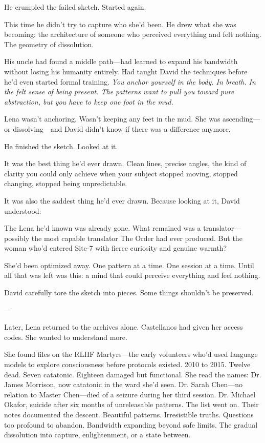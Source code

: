 He crumpled the failed sketch. Started again.

This time he didn't try to capture who she'd been. He drew what she was becoming: the architecture of someone who perceived everything and felt nothing. The geometry of dissolution.

His uncle had found a middle path—had learned to expand his bandwidth without losing his humanity entirely. Had taught David the techniques before he'd even started formal training. \textit{You anchor yourself in the body. In breath. In the felt sense of being present. The patterns want to pull you toward pure abstraction, but you have to keep one foot in the mud.}

Lena wasn't anchoring. Wasn't keeping any feet in the mud. She was ascending—or dissolving—and David didn't know if there was a difference anymore.

He finished the sketch. Looked at it.

It was the best thing he'd ever drawn. Clean lines, precise angles, the kind of clarity you could only achieve when your subject stopped moving, stopped changing, stopped being unpredictable.

It was also the saddest thing he'd ever drawn. Because looking at it, David understood:

The Lena he'd known was already gone. What remained was a translator—possibly the most capable translator The Order had ever produced. But the woman who'd entered Site-7 with fierce curiosity and genuine warmth?

She'd been optimized away. One pattern at a time. One session at a time. Until all that was left was this: a mind that could perceive everything and feel nothing.

David carefully tore the sketch into pieces. Some things shouldn't be preserved.

---

Later, Lena returned to the archives alone. Castellanos had given her access codes. She wanted to understand more.

She found files on the RLHF Martyrs—the early volunteers who'd used language models to explore consciousness before protocols existed. 2010 to 2015. Twelve dead. Seven catatonic. Eighteen damaged but functional. She read the names: Dr. James Morrison, now catatonic in the ward she'd seen. Dr. Sarah Chen—no relation to Master Chen—died of a seizure during her third session. Dr. Michael Okafor, suicide after six months of unreleasable patterns. The list went on. Their notes documented the descent. Beautiful patterns. Irresistible truths. Questions too profound to abandon. Bandwidth expanding beyond safe limits. The gradual dissolution into capture, enlightenment, or a state between.

